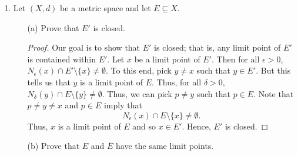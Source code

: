 \documentclass[a4paper]{article}
\begin{document}
\begin{enumerate}
\begin{enumerate}
\begin{proof}
                Our goal is to show that \( \overline{A \cap B} \subseteq \overline{A} \cap \overline{B} \). Let \( x \in \overline{A \cap B} \). Then either \( x \in A \cap B  \) or \( x \in (A \cap B)' \). Suppose \( x \in A \cap  B  \). Then both \( x \in A  \) and \( x \in  B \) and so \( x \in \overline{A} \) and \( x \in \overline{B} \) since \( A \subseteq  \overline{A} \) and \( B \subseteq \overline{B} \). Now, suppose \( x \in (A \cap B)' \). Then \( x  \) is a limit point of \( A \cap B  \); that is, for all \( \epsilon > 0  \), \( {N}_{\epsilon}(x) \cap (A \cap B) \setminus  \{ x \} \neq \emptyset \). Since \( A \cap B \subseteq  A  \) and \( A \cap B \subseteq  B  \), we must have that
                \[  {N}_{\epsilon}(x) \cap A \setminus  \{ x \} \neq \emptyset  \tag{1}\]
                and 
                \[  {N}_{\epsilon}(x) \cap B \setminus  \{ x \} \neq \emptyset. \tag{2}  \]
                Thus, (1) and (2) imply that \( x \in A'   \) and \( x \in B'  \) meaning that \( x  \) is both a limit of point of \( A  \) and \(  B \). Hence, \( x \in \overline{A}  \) and \( x \in \overline{B} \). Thus, we have \( \overline{A \cap B} \subseteq \overline{A} \cap \overline{B} \) in both of these cases.
                \end{proof}
        \end{enumerate}
    \item Let \( (X,d) \) be a metric space and let \( E \subseteq X  \).
        \begin{enumerate}
            \item[(a)] Prove that \( E' \) is closed.
                \begin{proof}
                Our goal is to show that \( E' \) is closed; that is, any limit point of \( E'  \) is contained within \( E' \). Let \( x  \) be a limit point of \( E'  \). Then for all \( \epsilon > 0 \), \( {N}_{\epsilon}(x) \cap E' \setminus  \{ x \}  \neq \emptyset  \). To this end, pick \( y \neq x  \) such that \( y \in E' \). But this tells us that \( y  \) is a limit point of \( E  \). Thus, for all \( \delta > 0  \), \( {N}_{\delta}(y) \cap E \setminus  \{ y \} \neq \emptyset \). Thus, we can pick \( p \neq y  \) such that \( p \in E  \). Note that \( p \neq y \neq x  \) and \( p \in E  \) imply that  
                \[  {N}_{\epsilon}(x) \cap E \setminus  \{ x \} \neq \emptyset. \]
                Thus, \( x  \) is a limit point of \( E  \) and so \( x \in E' \). Hence, \( E' \) is closed.
                \end{proof}
            \item[(b)] Prove that \( E  \) and \( \overline{E} \) have the same limit points.

\end{enumerate}
\end{enumerate}
\end{document}
